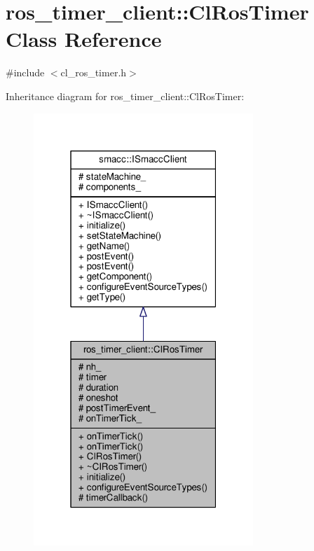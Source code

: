 \hypertarget{classros__timer__client_1_1ClRosTimer}{}\section{ros\+\_\+timer\+\_\+client\+:\+:Cl\+Ros\+Timer Class Reference}
\label{classros__timer__client_1_1ClRosTimer}


{\ttfamily \#include $<$cl\+\_\+ros\+\_\+timer.\+h$>$}



Inheritance diagram for ros\+\_\+timer\+\_\+client\+:\+:Cl\+Ros\+Timer\+:\nopagebreak
\begin{figure}[H]
\begin{center}
\leavevmode
\includegraphics[width=235pt]{classros__timer__client_1_1ClRosTimer__inherit__graph}
\end{center}
\end{figure}


